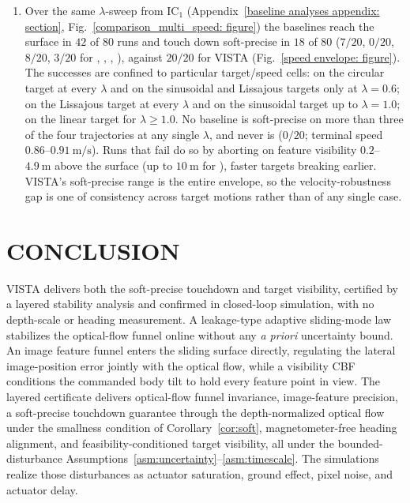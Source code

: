 \documentclass{IEEEtaes}
\theoremstyle{definition}
\theoremstyle{remark}
\begin{document}
\begin{enumerate}
    \item Over the same $\lambda$-sweep from IC$_1$ (Appendix~\ref{baseline analyses appendix: section}, Fig.~\ref{comparison_multi_speed: figure}) the baselines reach the surface in $42$ of $80$ runs and touch down soft-precise in $18$ of $80$ ($7/20$, $0/20$, $8/20$, $3/20$ for \cite{lin2022}, \cite{zhang2026}, \cite{lin2023}, \cite{cho2022}), against $20/20$ for VISTA (Fig.~\ref{speed envelope: figure}). The successes are confined to particular target/speed cells: \cite{lin2022} on the circular target at every $\lambda$ and on the sinusoidal and Lissajous targets only at $\lambda=0.6$; \cite{lin2023} on the Lissajous target at every $\lambda$ and on the sinusoidal target up to $\lambda=1.0$; \cite{cho2022} on the linear target for $\lambda\ge1.0$. No baseline is soft-precise on more than three of the four trajectories at any single $\lambda$, and \cite{zhang2026} never is ($0/20$; terminal speed $0.86$--$0.91~\text{m/s}$). Runs that fail do so by aborting on feature visibility $0.2$--$4.9~\text{m}$ above the surface (up to $10~\text{m}$ for \cite{cho2022}), faster targets breaking earlier. VISTA's soft-precise range is the entire envelope, so the velocity-robustness gap is one of consistency across target motions rather than of any single case.
\end{enumerate}

\section{CONCLUSION}
\label{conclusion: section}
VISTA delivers both the soft-precise touchdown and target visibility, certified by a layered stability analysis and confirmed in closed-loop simulation, with no depth-scale or heading measurement. A leakage-type adaptive sliding-mode law stabilizes the optical-flow funnel online without any \emph{a priori} uncertainty bound. An image feature funnel enters the sliding surface directly, regulating the lateral image-position error jointly with the optical flow, while a visibility CBF conditions the commanded body tilt to hold every feature point in view. The layered certificate delivers optical-flow funnel invariance, image-feature precision, a soft-precise touchdown guarantee through the depth-normalized optical flow under the smallness condition of Corollary~\ref{cor:soft}, magnetometer-free heading alignment, and feasibility-conditioned target visibility, all under the bounded-disturbance Assumptions~\ref{asm:uncertainty}--\ref{asm:timescale}. The simulations realize those disturbances as actuator saturation, ground effect, pixel noise, and actuator delay.
\end{document}

